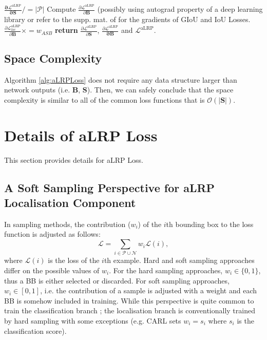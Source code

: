 \documentclass{article}
\begin{document}
\begin{algorithm}
\begin{algorithmic}[1]
\State $\mathbf{\frac{\partial \mathcal{L}^\mathrm{aLRP}}{ \partial S}}/=|\mathcal{P}|$
\State Compute $\frac{\partial \mathcal{L}^\mathrm{aLRP}}{ \partial \mathbf{B}}$ (possibly using autograd property of a deep learning library or refer to the supp. mat. of \cite{GIoULoss} for the gradients of GIoU and IoU Losses.
\State $\frac{\partial \mathcal{L}^\mathrm{aLRP}_{loc}}{ \partial \mathbf{B}} \times =w_{ASB}$
\State \textbf{return} $\frac{\partial \mathcal{L}^\mathrm{aLRP}}{ \partial \mathbf{S}}$, $\frac{\partial \mathcal{L}^\mathrm{aLRP}}{ \mathbf{\partial \mathbf{B}}}$ and  $\mathcal{L}^\mathrm{aLRP}$.
\end{algorithmic}
\end{algorithm} 

\subsection{Space Complexity} 
Algorithm \ref{alg:aLRPLoss} does not require any data structure larger than network outputs (i.e. $\mathbf{B}$, $\mathbf{S}$). Then, we can safely conclude that the space complexity is similar to all of the common loss functions that is $\mathcal{O}(|\mathbf{S}|)$.



\section{Details of aLRP Loss}
\label{sec:aLRP}
This section provides details for aLRP Loss.

\subsection{A Soft Sampling Perspective for aLRP Localisation Component}
In sampling methods, the contribution ($w_i$) of the $i$th bounding box to the loss function is adjusted as follows:
\begin{equation}
    \label{eq:SamplingEq}
    \mathcal{L} = \sum \limits_{i \in \mathcal{P} \cup \mathcal{N}} w_i \mathcal{L}(i),
\end{equation}
where $\mathcal{L}(i)$ is the loss of the $i$th example. Hard and soft sampling approaches differ on the possible values of $w_i$. For the hard sampling approaches, $w_i \in \{0,1\}$, thus a BB is either selected or discarded. For soft sampling approaches, $w_i \in [0,1]$, i.e. the contribution of a sample is adjusted with a weight and each BB is somehow included in training. While this perspective is quite common to train the classification branch \cite{PrimeSample,FocalLoss}; the localisation branch is conventionally trained by hard sampling with some exceptions (e.g. CARL \cite{PrimeSample} sets $w_i = s_i$ where $s_i$ is the classification score).
\end{document}
